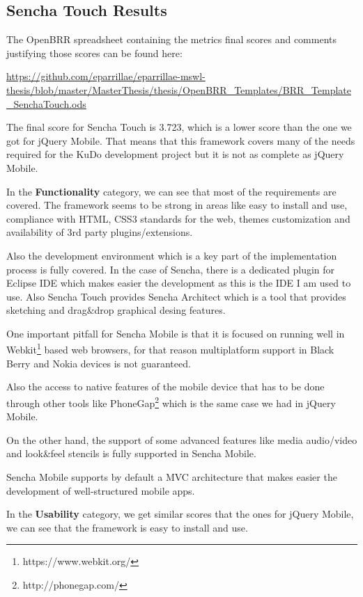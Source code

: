 \documentclass[a4paper,12pt]{book}
\begin{document}
\subsection{Sencha Touch Results}
\label{Sencha Touch Results}

The OpenBRR spreadsheet containing the metrics final scores and comments justifying those scores can be found here:

\url{
https://github.com/eparrillae/eparrillae-mswl-thesis/blob/master/MasterThesis/thesis/OpenBRR_Templates/BRR_Template_SenchaTouch.ods}

The final score for Sencha Touch is 3.723, which is a lower score than the one we got for jQuery Mobile. That means that this framework covers many of the needs required for the KuDo development project but it is not as complete as jQuery Mobile.

In the \textbf{Functionality} category, we can see that most of the requirements are covered. The framework seems to be strong in areas like easy to install and use, compliance with HTML, CSS3 standards for the web, themes customization and availability of 3rd party plugins/extensions. 

Also the development environment which is a key part of the implementation process is fully covered. In the case of Sencha, there is a dedicated plugin for Eclipse IDE\cite{sencha Eclipse Plugin}  which makes easier the development as this is the IDE I am used to use. Also Sencha Touch provides Sencha Architect\cite{sencha Architect} which is a tool that provides sketching and drag\&drop graphical desing features.

One important pitfall for Sencha Mobile is that it is focused on running well in Webkit\footnote{https://www.webkit.org/}  based web browsers, for that reason multiplatform support in Black Berry and Nokia devices is not guaranteed.

Also the access to native features of the mobile device that has to be done through other tools like PhoneGap\footnote{http://phonegap.com/} which is the same case we had in jQuery Mobile. 

On the other hand, the support of some advanced features like media audio/video and look\&feel stencils is fully supported in Sencha Mobile.

Sencha Mobile supports by default a MVC architecture\cite{sencha MVC}  that makes easier the development of well-structured mobile apps.

In the \textbf{Usability} category, we get similar scores that the ones for jQuery Mobile, we can see that the framework is easy to install and use.
\end{document}
